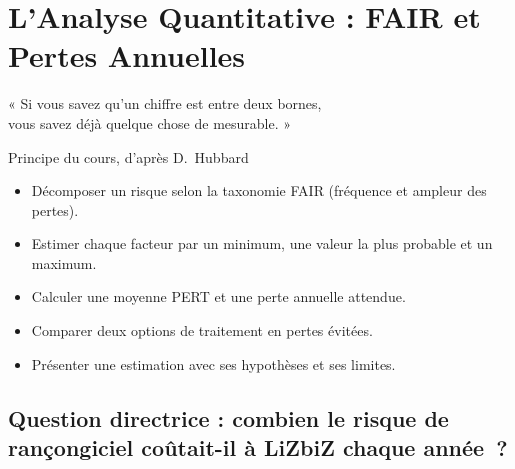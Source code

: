 
\chapter{L'Analyse Quantitative : FAIR et Pertes Annuelles}
\label{chap:quantitatif}

\epigraph{%
    « Si vous savez qu'un chiffre est entre deux bornes,\\
    vous savez déjà quelque chose de mesurable. »%
}{Principe du cours, d'après D.~Hubbard}


\begin{boxobjectifs}
\begin{itemize}
    \item Décomposer un risque selon la taxonomie FAIR (fréquence et
          ampleur des pertes).
    \item Estimer chaque facteur par un minimum, une valeur la plus
          probable et un maximum.
    \item Calculer une moyenne PERT et une perte annuelle attendue.
    \item Comparer deux options de traitement en pertes évitées.
    \item Présenter une estimation avec ses hypothèses et ses limites.
\end{itemize}
\end{boxobjectifs}

\bigskip

\section*{Question directrice : combien le risque de rançongiciel coûtait-il à LiZbiZ chaque année~?}

